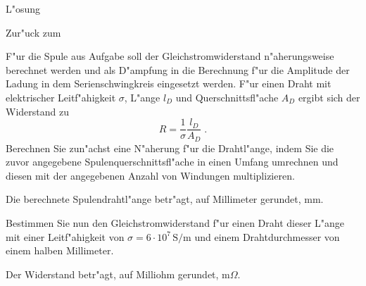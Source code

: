 \begin{MExercises}
\begin{MExercise}
\begin{MHint}{L"osung}
\begin{center}
\end{center}
\begin{center}
\end{center}

\end{MHint}

Zur"uck zum 
\end{MExercise}

\begin{MExercise}
F"ur die Spule aus Aufgabe  soll der Gleichstromwiderstand n"aherungsweise berechnet werden und als D"ampfung in die Berechnung f"ur die Amplitude der Ladung in dem Serienschwingkreis eingesetzt werden. F"ur einen Draht mit elektrischer Leitf"ahigkeit $\sigma$, L"ange $l_D$ und Querschnittsfl"ache $A_D$ ergibt sich der Widerstand zu
\begin{equation}
  R=\frac{1}{\sigma}\frac{l_D}{A_D}\; .
\end{equation}
Berechnen Sie zun"achst eine N"aherung f"ur die Drahtl"ange, indem Sie die zuvor angegebene Spulenquerschnittsfl"ache in einen Umfang umrechnen und diesen mit der angegebenen Anzahl von Windungen multiplizieren.

Die berechnete Spulendrahtl"ange betr"agt, auf Millimeter gerundet,  mm.

Bestimmen Sie nun den Gleichstromwiderstand f"ur einen Draht dieser L"ange mit einer Leitf"ahigkeit von $\sigma = 6\cdot 10^7\,\text{S/m}$ und einem Drahtdurchmesser von einem halben Millimeter.

Der Widerstand betr"agt, auf Milliohm gerundet,  m$\Omega$.


\end{MExercise}
\end{MExercises}
